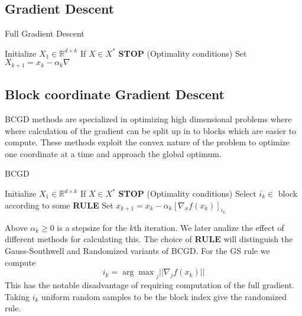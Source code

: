 \documentclass{article}
\begin{document}
\subsection{Gradient Descent}
\begin{algorithm}
\caption{Full Gradient Descent}\label{alg:cap}
\begin{algorithmic}
\State Initialize $X_1 \in \mathbb{R}^{d\times k}$
    \State If $X \in X^*$ \textbf{STOP} (Optimality conditions)
    \State Set $X_{k+1} = x_k - \alpha_{k}\nabla$
\EndFor
\end{algorithmic}
\end{algorithm}

\subsection{Block coordinate Gradient Descent}
BCGD methods are specialized in optimizing high dimensional problems where where calculation of the gradient can be split up in to blocks which are easier to compute. These methods exploit the convex nature of the problem to optimize one coordinate at a time and approach the global optimum.
\begin{algorithm}
\caption{BCGD}\label{alg:cap}
\begin{algorithmic}
\State Initialize $X_1 \in \mathbb{R}^{d\times k}$
    \State If $X \in X^*$ \textbf{STOP} (Optimality conditions)
    \State Select $i_k \in $ block according to some \textbf{RULE}
    \State Set $x_{k+1} = x_k - \alpha_k[\nabla_x f(x_k)]_{i_k}$
\EndFor
\end{algorithmic}
\end{algorithm}
Above $\alpha_k \geq 0$ is a stepsize for the $k$th iteration. We later analize the effect of different methods for calculating this. The choice of \textbf{RULE} will distinguish the Gauss-Southwell and Randomized variants of BCGD. For the GS rule we compute 
$$i_k = {\arg\max}_j ||\nabla_j f(x_k)||$$
This has the notable disadvantage of requiring computation of the full gradient.
Taking $i_k$ uniform random samples to be the block index give the randomized rule. 
\end{document}
